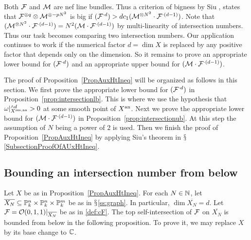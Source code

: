 Both ${\mathcal F}$ and ${\mathcal M}$ are nef line bundles. Thus a criterion of bigness
by Siu \cite[Theorem~2.2.15]{PosAlgGeom}, states that ${\mathcal F}^{\otimes q}
\otimes {\mathcal M}^{\otimes -p N^2}$ is big if $({\mathcal F}^{\cdot d}) > d c_1
({\mathcal M}^{\otimes N^2} \cdot {\mathcal F}^{\cdot (d-1)})$.
Note that $({\mathcal M}^{\otimes N^2} \cdot {\mathcal F}^{\cdot (d-1)}) = N^2 ({\mathcal M} \cdot {\mathcal F}^{\cdot (d-1)})$ by multi-linearity of intersection numbers. 
Thus our task 
becomes comparing two intersection numbers. Our application continues
to work if the numerical
factor $d = \dim X$ is replaced by any
positive  factor that depends only on the dimension.
So it remains to prove an appropriate lower bound for $({\mathcal F}^{\cdot d})$ and an appropriate upper bound for $({\mathcal M} \cdot {\mathcal F}^{\cdot (d-1)})$.

The proof of Proposition~\ref{PropAuxHtIneq} will be organized as follows in this section. We first prove the appropriate lower bound for $({\mathcal F}^{\cdot d})$ in Proposition~\ref{prop:intersectionlb}. This is where we use the hypothesis that $\omega|_{{X}^{\mathrm{sm,an}}}^{\wedge d} >0$ at some smooth point of ${X}^{\mathrm{an}}$. Next we prove the appropriate lower bound for $({\mathcal M} \cdot {\mathcal F}^{\cdot (d-1)})$ in Proposition~\ref{prop:intersectionub}. At this step the assumption of $N$ being a power of $2$ is used. Then we finish the proof of Proposition~\ref{PropAuxHtIneq} by applying Siu's theorem in $\mathsection$\ref{SubsectionProofOfAUxHtIneq}.




\subsection{Bounding an intersection number from below}
Let $X$ be as in Proposition~\ref{PropAuxHtIneq}. 
For each $N \in {\mathbb{N}}$, let $\overline{X_N} \subseteq {\mathbb{P}}_k^n \times
{\mathbb{P}}_k^n \times {\mathbb{P}}_k^m$ be as in $\mathsection$\ref{ss:graph}.
In particular, $\dim \overline{X_N} = d$.
 Let ${\mathcal F} =
{\mathcal O}(0,1,1)|_{\overline{X_N}}$ be as in \eqref{def:cF}. The top
self-intersection of ${\mathcal F}$ on $\overline{X_N}$ is bounded from below
in the following proposition.
To prove it, we may replace $X$ by its base change to ${\mathbb{C}}$. 

